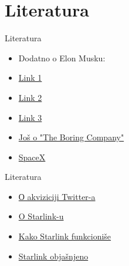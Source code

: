 \documentclass[14pt, aspectratio=169]{beamer}
\begin{document}
\section{Literatura}
\begin{frame}{Literatura}
\transpush

\appendix

\iffalse
 

\fi

\begin{thebibliography}{5}

\begin{itemize}
    \item {\footnotesize {Dodatno o Elon Musku:}}
    \item {\footnotesize \href{https://www.astronomija.org.rs/biografije/14055-ilon-mask-kratka biografija}{Link 1}}
    \item {\footnotesize \href{https://www.forbes.com/profile/elon-musk/?sh=6b4c47f57999}{Link 2}}
    \item {\footnotesize \href{https://sr.m.wikipedia.org/wiki/Илон_Маск}{Link 3} }
    \item {\footnotesize \href{https://www.nbcnews.com/tech/tech-news/urban-tunnels-musk-s-boring-co-draw-industry-skepticism-n1269677}{Još o "The Boring Company"}}
    
    \item {\footnotesize \href{https://sr.m.wikipedia.org/sr-ec/SpaceX#cite_ref-NYT-20120525_4-0}{SpaceX}}
    
\end{itemize} 


\end{thebibliography}
\end{frame}

\begin{frame}{Literatura}
\transpush

\appendix

\iffalse
 

\fi

\begin{thebibliography}{4}


\begin{itemize}
    
     \item {\footnotesize \href{https://en.wikipedia.org/wiki/Acquisition_of_Twitter_by_Elon_Musk}{О akviziciji Twitter-a}}
     \item {\footnotesize \href{https://en.wikipedia.org/wiki/Starlink#Background}{O Starlink-u}}
     \item {\footnotesize \href{https://www.zdnet.com/home-and-office/networking/starlink-satellite-internet-how-does-it-work-cost-features-speed/}{Kako Starlink funkcioniše}}
     \item {\footnotesize \href{https://www.cnet.com/home/internet/starlink-satellite-internet-explained/}{Starlink objašnjeno}}
     
    

\end{itemize} 


\end{thebibliography}

\end{frame}
\end{document}
